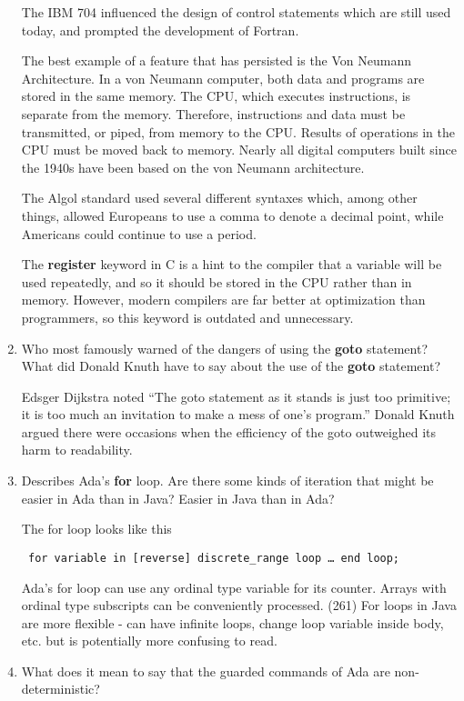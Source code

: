 \begin{enumerate}
    The IBM 704 influenced the design of control statements which are still used today, and prompted the development of Fortran. 
    
	The best example of a feature that has persisted is the Von Neumann Architecture. In a von Neumann computer, both data and programs are stored in the same memory. The CPU, which executes instructions, is separate from the memory. Therefore, instructions and data must be transmitted, or piped, from memory to the CPU. Results of operations in the CPU must be moved back to memory. Nearly all digital computers built since the 1940s have been based on the von Neumann architecture.
    
The Algol standard used several different syntaxes which, among other things, allowed Europeans to use a comma to denote a decimal point, while Americans could continue to use a period.

The \textbf{register} keyword in C is a hint to the compiler that a variable will be used repeatedly, and so it should be stored in the CPU rather than in memory. However, modern compilers are far better at optimization than programmers, so this keyword is outdated and unnecessary.

  \item Who most famously warned of the dangers of using the
    \textbf{goto} statement? What did Donald Knuth have to
    say about the use of the \textbf{goto} statement?
    
    Edsger Dijkstra noted “The goto statement as it stands is just too primitive; it is too much an invitation to make a mess of one’s program.” Donald Knuth argued there were occasions when the efficiency of the goto outweighed its harm to readability.

  \item Describes Ada's \textbf{for} loop. Are there some
    kinds of iteration that might be easier in Ada than
    in Java? Easier in Java than in Ada?
    
    The for loop looks like this
\begin{lstlisting} for variable in [reverse] discrete_range loop … end loop; \end{lstlisting}
Ada’s for loop can use any ordinal type variable for its counter. Arrays with ordinal type subscripts can be conveniently processed. (261) For loops in Java are more flexible - can have infinite loops, change loop variable inside body, etc. but is potentially more confusing to read.


  \item What does it mean to say that the guarded commands
    of Ada are non-deterministic?
    

\end{enumerate}
